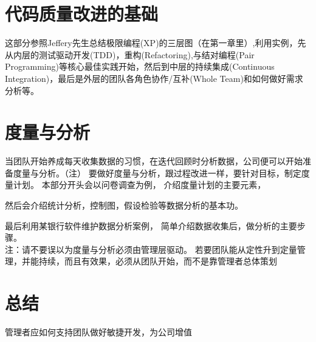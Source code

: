 \documentclass{book}        %
\begin{document}
\part{代码质量改进的基础}这部分参照Jeffery先生总结极限编程(XP)的三层图（在第一章里）,利用实例，先从内层的测试驱动开发(TDD)，重构(Refactoring),与结对编程(Pair Programming)等核心最佳实践开始，然后到中层的持续集成(Continuous Integration)，最后是外层的团队各角色协作/互补(Whole Team)和如何做好需求分析等。 \\


\part{度量与分析}当团队开始养成每天收集数据的习惯，在迭代回顾时分析数据，公司便可以开始准备度量与分析。（注）
要做好度量与分析，跟过程改进一样，要针对目标，制定度量计划。
本部分开头会以问卷调查为例，
介绍度量计划的主要元素，

然后会介绍统计分析，控制图，假设检验等数据分析的基本功。

最后利用某银行软件维护数据分析案例，
简单介绍数据收集后，做分析的主要步骤。\\


注：请不要误以为度量与分析必须由管理层驱动。
若要团队能从定性升到定量管理，并能持续，而且有效果，必须从团队开始，而不是靠管理者总体策划
\\



\part{总结} 管理者应如何支持团队做好敏捷开发，为公司增值\\



\end{document}
